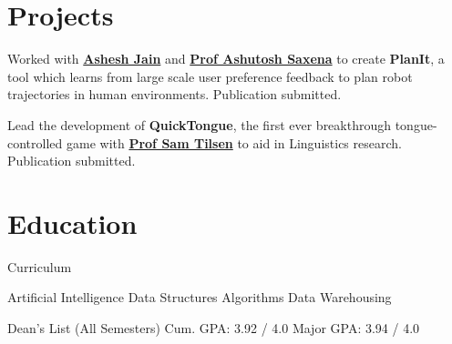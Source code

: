 \documentclass[]{deedy-resume-openfont}
\begin{document}
\sectionsep


\section{Projects}
Worked with \textbf{\href{http://www.cs.cornell.edu/~ashesh/}{Ashesh Jain}} and \textbf{\href{http://www.cs.cornell.edu/~asaxena/}{Prof Ashutosh Saxena}} to create \textbf{PlanIt}, a tool which  learns from large scale user preference feedback to plan robot trajectories in human environments.  Publication submitted.
\sectionsep

Lead the development of \textbf{QuickTongue}, the first ever breakthrough tongue-controlled game with \textbf{\href{http://conf.ling.cornell.edu/~tilsen/}{Prof Sam Tilsen}} to aid in Linguistics research. Publication submitted.
\sectionsep

\section{Education}
Curriculum

Artificial Intelligence \textbullet{} Data Structures \textbullet{} Algorithms \textbullet{} Data Warehousing
\sectionsep

Dean's List (All Semesters) \textbullet{}
Cum. GPA: 3.92 / 4.0 \textbullet{}
Major GPA: 3.94 / 4.0
\sectionsep
\end{document}
